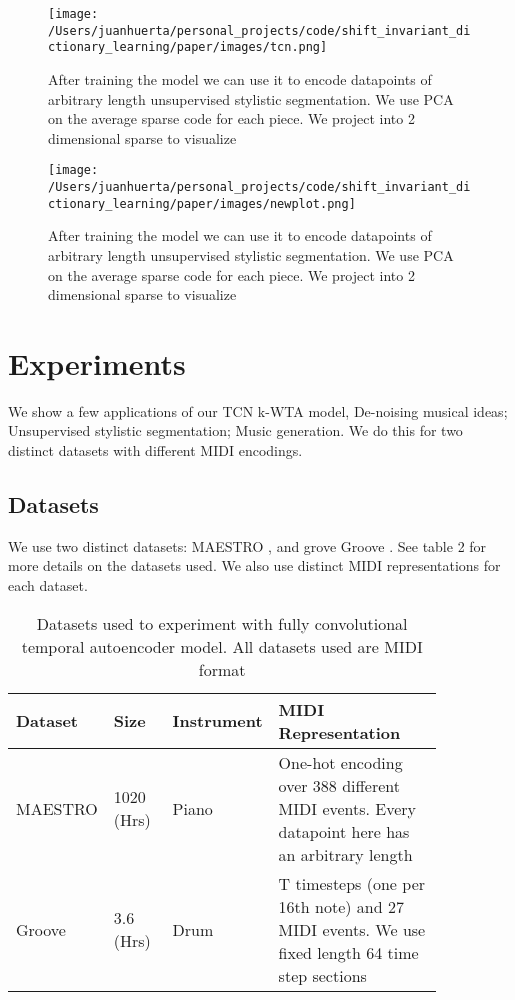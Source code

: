 \documentclass[11pt,a4paper]{article}
\begin{document}
\begin{figure}[ht]
  \texttt{[image: /Users/juanhuerta/personal\_projects/code/shift\_invariant\_dictionary\_learning/paper/images/tcn.png]}
  \caption{After training the model we can use it to encode datapoints of arbitrary length unsupervised stylistic segmentation. We use PCA on the average sparse code for each piece. We project into 2 dimensional sparse to visualize }
  \label{fig:boat1}
\end{figure}

\begin{figure*}[ht]
  \texttt{[image: /Users/juanhuerta/personal\_projects/code/shift\_invariant\_dictionary\_learning/paper/images/newplot.png]}
  \caption{After training the model we can use it to encode datapoints of arbitrary length unsupervised stylistic segmentation. We use PCA on the average sparse code for each piece. We project into 2 dimensional sparse to visualize }
  \label{fig:boat1}
\end{figure*}




\section{Experiments}
\label{ssec:experiments}

We show a few applications of our TCN k-WTA model, De-noising musical ideas; Unsupervised stylistic segmentation; Music generation. We do this for two distinct datasets with different MIDI encodings.


\subsection{Datasets}
\label{ssec:experiments}

We use two distinct datasets: MAESTRO  \cite{hawthorne2018enabling}, and  grove Groove  \cite{groove2019} . See table 2 for more details on the datasets used. We also use distinct MIDI representations for each dataset. 

\begin{table*}[ht]
    \centering
    \begin{tabular}{p{0.15\linewidth} | p{0.15\linewidth} | p{0.1\linewidth}  | p{0.45\linewidth} }
      Dataset  & Size  & Instrument &  MIDI Representation\\ \hline
      MAESTRO  & 1020 (Hrs)   & Piano &  One-hot encoding over 388 different MIDI events. Every datapoint here has an arbitrary length \\
        \hline
        Groove & 3.6 (Hrs)  & Drum &  T timesteps (one per 16th note) and 27 MIDI events. We use fixed length 64 time step sections\\
    \end{tabular}
    \caption{Datasets used to experiment with fully convolutional temporal autoencoder model. All datasets used are MIDI format }
    \label{tab:my_label}
\end{table*}
\end{document}
